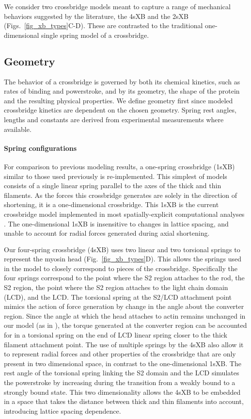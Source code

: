 \documentclass[]{article}
\begin{document}
We consider two crossbridge models meant to capture a range of mechanical behaviors suggested by the literature, the 4sXB and the 2sXB (Figs.~\ref{fig_xb_types}C-D).  
These are contrasted to the traditional one-dimensional single spring model of a crossbridge.

\subsection*{Geometry} %

The behavior of a crossbridge is governed by both its chemical kinetics, such as rates of binding and powerstroke, and by its geometry, the shape of the protein and the resulting physical properties.
We define geometry first since modeled crossbridge kinetics are dependent on the chosen geometry.
Spring rest angles, lengths and constants are derived from experimental measurements where available.

\paragraph{Spring configurations} %
For comparison to previous modeling results, a one-spring crossbridge (1sXB) similar to those used previously is re-implemented.
This simplest of models consists of a single linear spring parallel to the axes of the thick and thin filaments.
As the forces this crossbridge generates are solely in the direction of shortening, it is a one-dimensional crossbridge. 
This 1sXB is the current crossbridge model implemented in most spatially-explicit computational analyses \citep{Daniel1998, Chase:2004:p204, Tanner2007}. 
The one-dimensional 1sXB is insensitive to changes in lattice spacing, and unable to account for radial forces generated during axial shortening.

Our four-spring crossbridge (4sXB) uses two linear and two torsional springs to represent the myosin head (Fig.~\ref{fig_xb_types}D).
This allows the springs used in the model to closely correspond to pieces of the crossbridge.
Specifically the four springs correspond to the point where the S2 region attaches to the rod, the S2 region, the point where the S2 region attaches to the light chain domain (LCD), and the LCD. 
The torsional spring at the S2/LCD attachment point mimics the action of force generation by change in the angle about the converter region. 
Since the angle at which the head attaches to actin remains unchanged in our model (as in ), the torque generated at the converter region can be accounted for in a torsional spring on the end of LCD linear spring closer to the thick filament attachment point. %
The use of multiple springs by the 4sXB also allow it to represent radial forces and other properties of the crossbridge that are only present in two dimensional space, in contrast to the one-dimensional 1sXB. 
The rest angle of the torsional spring linking the S2 domain and the LCD simulates the powerstroke by increasing during the transition from a weakly bound to a strongly bound state.
This two dimensionality allows the 4sXB to be embedded in a space that takes the distance between thick and thin filaments into account, introducing lattice spacing dependence.
\end{document}
